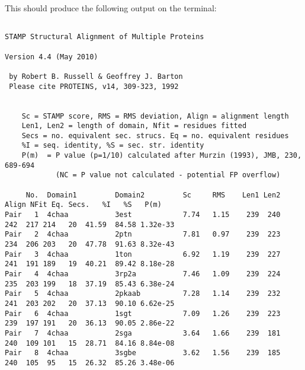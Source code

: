 This should produce the following output on the terminal:\\
\begin{scriptsize}\begin{verbatim}

STAMP Structural Alignment of Multiple Proteins

Version 4.4 (May 2010)

 by Robert B. Russell & Geoffrey J. Barton 
 Please cite PROTEINS, v14, 309-323, 1992


    Sc = STAMP score, RMS = RMS deviation, Align = alignment length
    Len1, Len2 = length of domain, Nfit = residues fitted
    Secs = no. equivalent sec. strucs. Eq = no. equivalent residues
    %I = seq. identity, %S = sec. str. identity
    P(m)  = P value (p=1/10) calculated after Murzin (1993), JMB, 230, 689-694
            (NC = P value not calculated - potential FP overflow)

     No.  Domain1         Domain2         Sc     RMS    Len1 Len2  Align NFit Eq. Secs.   %I   %S   P(m)
Pair   1  4chaa           3est            7.74   1.15    239  240   242  217 214   20  41.59  84.58 1.32e-33 
Pair   2  4chaa           2ptn            7.81   0.97    239  223   234  206 203   20  47.78  91.63 8.32e-43 
Pair   3  4chaa           1ton            6.92   1.19    239  227   241  191 189   19  40.21  89.42 8.18e-28 
Pair   4  4chaa           3rp2a           7.46   1.09    239  224   235  203 199   18  37.19  85.43 6.38e-24 
Pair   5  4chaa           2pkaab          7.28   1.14    239  232   241  203 202   20  37.13  90.10 6.62e-25 
Pair   6  4chaa           1sgt            7.09   1.26    239  223   239  197 191   20  36.13  90.05 2.86e-22 
Pair   7  4chaa           2sga            3.64   1.66    239  181   240  109 101   15  28.71  84.16 8.84e-08 
Pair   8  4chaa           3sgbe           3.62   1.56    239  185   240  105  95   15  26.32  85.26 3.48e-06 


\end{verbatim}
\end{scriptsize}
